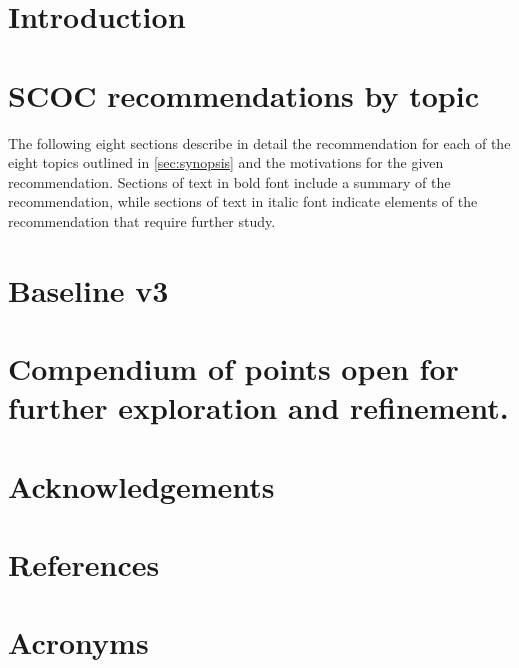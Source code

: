 \section{Introduction}




%
\clearpage

\section{SCOC recommendations by topic}\label{sec:rec}
The following eight sections describe in detail the recommendation for each of the eight topics outlined in \autoref{sec:synopsis} and the motivations for the given recommendation. Sections of text in bold font include a summary of the recommendation, while sections of text in italic font indicate elements of the recommendation that require further study. 


\clearpage

\section{Baseline v3}\label{sec:v3}

\clearpage

\section{Compendium of points open for further exploration and refinement.}
\label{sec:refinements}
\clearpage


\appendix
\section{Acknowledgements}


\section{References} %
\renewcommand{\refname}{} %

%

\section{Acronyms} %

